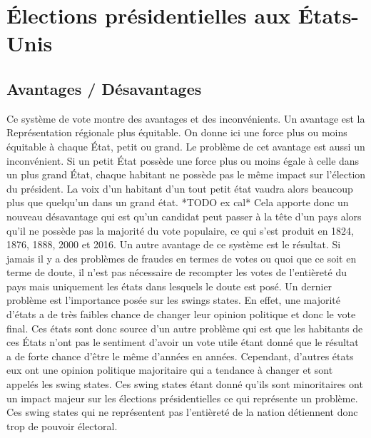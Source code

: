 \documentclass[12pt,a4paper]{report}
\begin{document}
\section{Élections présidentielles aux États-Unis}

\subsection{Avantages / Désavantages} %
Ce système de vote montre des avantages et des inconvénients.
Un avantage est la Représentation régionale plus équitable.
On donne ici une force plus ou moins équitable à chaque État, petit ou grand.
Le problème de cet avantage est aussi un inconvénient.
Si un petit État possède une force plus ou moins égale à celle dans un plus grand État, chaque habitant ne possède pas le même impact sur l'élection du président.
La voix d’un habitant d’un tout petit état vaudra alors beaucoup plus que quelqu’un dans un grand état. *TODO ex cal*
Cela apporte donc un nouveau désavantage qui est qu’un candidat peut passer à la tête d’un pays alors qu’il ne possède pas la majorité du vote populaire, ce qui s’est produit en 1824, 1876, 1888, 2000 et 2016.
Un autre avantage de ce système est le résultat.
Si jamais il y a des problèmes de fraudes en termes de votes ou quoi que ce soit en terme de doute, il n’est pas nécessaire de recompter les votes de l'entièreté du pays mais uniquement les états dans lesquels le doute est posé.
Un dernier problème est l’importance posée sur les swings states.
En effet, une majorité d’états a de très faibles chance de changer leur opinion politique et donc le vote final.
Ces états sont donc source d’un autre problème qui est que les habitants de ces États n’ont pas le sentiment d’avoir un vote utile étant donné que le résultat a de forte chance d’être le même d’années en années.
Cependant, d’autres états eux ont une opinion politique majoritaire qui a tendance à changer et sont appelés les swing states.
Ces swing states étant donné qu’ils sont minoritaires ont un impact majeur sur les élections présidentielles ce qui représente un problème.
Ces swing states qui ne représentent pas l'entièreté de la nation détiennent donc trop de pouvoir électoral.
\nocite{greelane:eleccoll}
\nocite{gov:fedpapers68}
\end{document}
